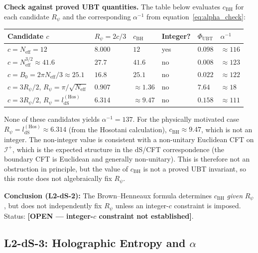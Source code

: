 \documentclass[11pt,a4paper]{article}
\theoremstyle{definition}
\theoremstyle{remark}
\begin{document}
\textbf{Check against proved UBT quantities.}
The table below evaluates $c_{\mathrm{BH}}$ for each candidate $R_\psi$
and the corresponding $\alpha^{-1}$ from equation~\eqref{eq:alpha_check}:

\begin{center}
\begin{tabular}{llllll}
  \toprule
  Candidate $c$ & $R_\psi = 2c/3$ & $c_{\mathrm{BH}}$ & Integer? & $\Phi_{\mathrm{UBT}}$ & $\alpha^{-1}$ \\
  \midrule
  $c = N_{\mathrm{eff}} = 12$
    & $8.000$
    & $12$
    & yes
    & $0.098$
    & $\approx 116$ \\
  $c = N_{\mathrm{eff}}^{3/2} \approx 41.6$
    & $27.7$
    & $41.6$
    & no
    & $0.008$
    & $\approx 123$ \\
  $c = B_0 = 2\pi N_{\mathrm{eff}}/3 \approx 25.1$
    & $16.8$
    & $25.1$
    & no
    & $0.022$
    & $\approx 122$ \\
  $c = 3R_\psi/2$, $R_\psi = \pi/\sqrt{N_{\mathrm{eff}}}$
    & $0.907$
    & $\approx 1.36$
    & no
    & $7.64$
    & $\approx 18$ \\
  $c = 3R_\psi/2$, $R_\psi = l_{\mathrm{dS}}^{(\mathrm{Hos})}$
    & $6.314$
    & $\approx 9.47$
    & no
    & $0.158$
    & $\approx 111$ \\
  \bottomrule
\end{tabular}
\end{center}

None of these candidates yields $\alpha^{-1} = 137$.
For the physically motivated case $R_\psi = l_{\mathrm{dS}}^{(\mathrm{Hos})}
\approx 6.314$ (from the Hosotani calculation),
$c_{\mathrm{BH}} \approx 9.47$, which is not an integer.
The non-integer value is consistent with a non-unitary Euclidean CFT on
$\mathcal{I}^+$, which is the expected structure in the dS/CFT
correspondence (the boundary CFT is Euclidean and generally non-unitary).
This is therefore not an obstruction in principle, but the value of
$c_{\mathrm{BH}}$ is not a proved UBT invariant, so this route does
not algebraically fix $R_\psi$.

\textbf{Conclusion (L2-dS-2):} The Brown--Henneaux formula determines
$c_{\mathrm{BH}}$ \emph{given} $R_\psi$, but does not independently fix
$R_\psi$ unless an integer-$c$ constraint is imposed.
Status: \textbf{[OPEN --- integer-$c$ constraint not established]}.

\subsection{L2-dS-3: Holographic Entropy and $\alpha$}
\label{subsec:L2dS3}
\end{document}
